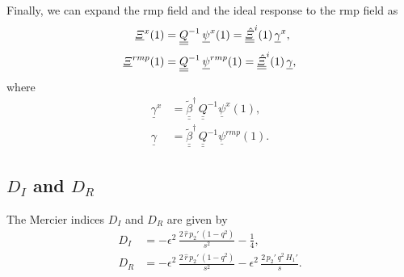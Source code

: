 \documentclass[12pt,prb,aps,notitlepage]{revtex4-1}
\begin{document}
Finally, we can expand the rmp field and the ideal response to the rmp field as
\begin{align}
\underline{\mit\Xi}^x(1)&=\underline{\underline{Q}}^{-1}\,\underline{\psi}^x(1) =\underline{\underline{\hat{\mit\Xi}}}^i(1)\,\underline{\gamma}^x,\\[0.5ex]
\underline{\mit\Xi}^{rmp}(1) &=\underline{\underline{Q}}^{-1}\,\underline{\psi}^{rmp}(1) =\underline{\underline{\hat{\mit\Xi}}}^i(1)\,\underline{\gamma},
\end{align}
where 
\begin{align}
\underline{\gamma}^x&= \underline{\underline{\tilde{\beta}}}^\dag\,\underline{\underline{Q}}^{-1}\underline{\psi}^x(1),\\[0.5ex]
\underline{\gamma}&= \underline{\underline{\tilde{\beta}}}^\dag\,\underline{\underline{Q}}^{-1}\underline{\psi}^{rmp}(1).
\end{align}

\subsection{$D_I$ and $D_R$}
The Mercier indices $D_I$ and $D_R$ are given by
\begin{align}
D_I &= - \epsilon^2\,\frac{2\,\hat{r}\,p_2'\,(1-q^2)}{s^2} -\frac{1}{4},\\[0.5ex]
D_R &= - \epsilon^2\,\frac{2\,\hat{r}\,p_2'\,(1-q^2)}{s^2} -\epsilon^2\,\frac{2\,p_2'\,q^2\,H_1'}{s}.
\end{align}
\end{document}
